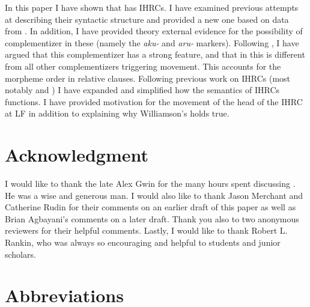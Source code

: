 \documentclass[output=paper]{LSP/langsci}
\begin{document}
In this paper I have shown that  has IHRCs. I have examined previous attempts at describing their syntactic structure and provided a new one based on data from . In addition, I have provided theory external evidence for the possibility of complementizer in these  (namely the \textit{aku-} and \textit{aru-} markers). Following \citet{Culy1990}, I have argued that this complementizer has a strong feature, and that in  this is different from all other complementizers triggering movement. This accounts for the morpheme order in  relative clauses.  Following previous work on IHRCs (most notably \citealt{Williamson1987} and \citealt{Culy1990}) I have expanded and simplified how the semantics of IHRCs functions. I have provided motivation for the movement of the head of the IHRC at LF in addition to explaining why Williamson's  holds true.

\section*{Acknowledgment}

I would like to thank the late Alex Gwin for the many hours spent discussing . He was a wise and generous man. I would also like to thank Jason Merchant and Catherine Rudin for their comments on an earlier draft of this paper as well as Brian Agbayani's comments on a later draft. Thank you also to two anonymous reviewers for their helpful comments. Lastly, I would like to thank Robert L. Rankin, who was always so encouraging and helpful to students and junior scholars.

\section*{Abbreviations}
\end{document}

